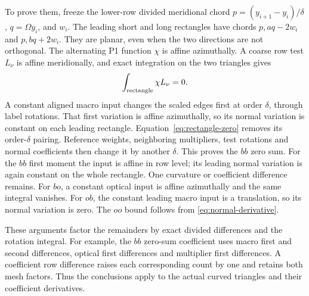 \documentclass[11pt,a4paper]{article}
\numberwithin{equation}{section}
\theoremstyle{remark}
\begin{document}
To prove them, freeze the lower-row divided meridional chord
\(p=(y_{i+1}-y_i)/\delta\), \(q=\Omega y_i\), and \(w_i\).
The leading short and long rectangles have chords
\(p,aq-2w_i\) and \(p,bq+2w_i\). They are planar, even when
the two directions are not orthogonal. The alternating P1 function
\(\chi\) is affine azimuthally. A coarse row test \(L_\nu\) is affine
meridionally, and exact integration on the two triangles gives
\begin{equation}\label{eq:rectangle-zero}
                  \int_{\rm rectangle}\chi L_\nu=0 .
\end{equation}
A constant aligned macro input changes the scaled edges first at
order \(\delta\), through label rotations. That first variation is
affine azimuthally, so its normal variation is constant on each
leading rectangle. Equation~\eqref{eq:rectangle-zero} removes its
order-\(\delta\) pairing. Reference weights, neighboring multipliers,
test rotations and normal coefficients then change it by another
\(\delta\). This proves the \(bb\) zero sum.
For the \(bb\) first moment the input is affine in row level; its
leading normal variation is again constant on the whole rectangle.
One curvature or coefficient difference remains. For \(bo\), a
constant optical input is affine azimuthally and the same integral
vanishes. For \(ob\), the constant leading macro input is a
translation, so its normal variation is zero. The \(oo\) bound follows
from \eqref{eq:normal-derivative}.

These arguments factor the remainders by exact divided differences
and the rotation integral. For example, the \(bb\) zero-sum
coefficient uses macro first and second differences, optical first
differences and multiplier first differences. A coefficient row
difference raises each corresponding count by one and retains both
mesh factors. Thus the conclusions apply to the actual curved
triangles and their coefficient derivatives.
\end{document}
